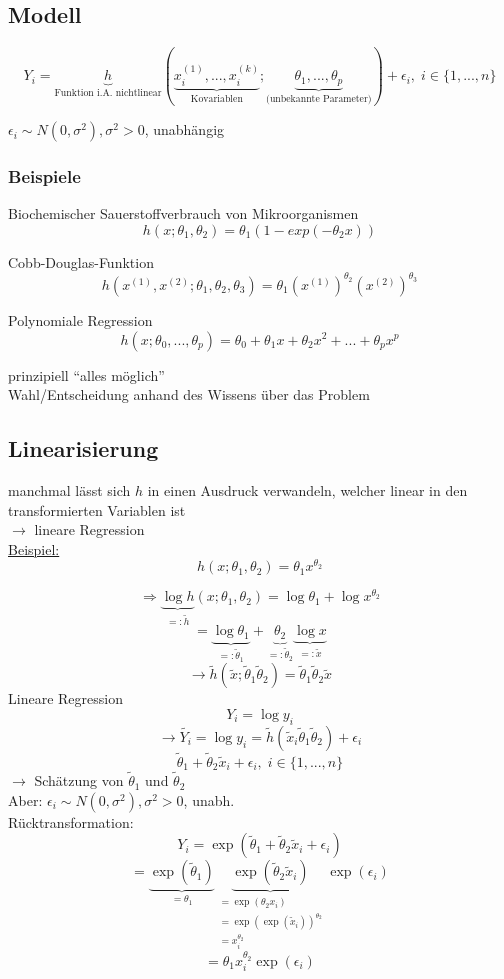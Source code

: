 \documentclass[10pt]{report}
\theoremstyle{definition}
\begin{document}
\subsection{Modell}
\[Y_i = \underbrace{h}_{\text{Funktion i.A. nichtlinear}} \left(\underbrace{x_i^{(1)},...,x_i^{(k)}}_{\text{Kovariablen}};
\underbrace{\theta_1,...,\theta_p}_{\text{(unbekannte Parameter)}} \right) + \epsilon_i, \; i \in \{1,...,n\} \]

$\epsilon_i \sim N(0,\sigma^2) , \sigma^2 >0$, unabhängig

\subsubsection{Beispiele}
Biochemischer Sauerstoffverbrauch von Mikroorganismen
\[h(x;\theta_1,\theta_2) = \theta_1(1-exp(-\theta_2 x)) \]

Cobb-Douglas-Funktion
\[h(x^{(1)},x^{(2)}; \theta_1, \theta_2, \theta_3)= \theta_1(x^{(1)})^{\theta_2} (x^{(2)})^{\theta_3} \]

Polynomiale Regression
\[h(x; \theta_0,..., \theta_p)= \theta_0 + \theta_1 x  + \theta_2 x^2 + ... + \theta_p x^p \]

prinzipiell ``alles möglich'' \\

Wahl/Entscheidung anhand des Wissens über das Problem

\subsection{Linearisierung}
manchmal lässt sich $h$ in einen Ausdruck verwandeln, welcher linear in den transformierten Variablen ist \\
$\rightarrow$ lineare Regression \\
\underline{Beispiel:}
\[ h(x; \theta_1, \theta_2) = \theta_1 x^{\theta_2} \]

\[ \Rightarrow \underbrace{\log h}_{=:  \tilde{h}}(x; \theta_1, \theta_2) = \log \theta_1 + \log x^{\theta_2} \]
\[= \underbrace{\log \theta_1}_{=: \tilde{\theta}_1} + \underbrace{\theta_2}_{=: \tilde{\theta}_2} \underbrace{ \log x }_{=: \tilde{x}} \]
\[ \rightarrow \tilde{h}(\tilde{x};\tilde{\theta}_1 \tilde{\theta}_2 ) = \tilde{\theta}_1 \tilde{\theta}_2 \tilde{x} \]
Lineare Regression
\[ Y_i=\log y_i \]
\[ \rightarrow \tilde{Y_i} = \log y_i = \tilde{h}(\tilde{x}_i \tilde{\theta}_1 \tilde{\theta}_2) + \epsilon_i \]
\[ \tilde{\theta}_1 + \tilde{\theta}_2 \tilde{x}_i + \epsilon_i, \; i \in \{1,...,n\} \]
$\rightarrow$ Schätzung von $\tilde{\theta}_1$ und $\tilde{\theta}_2$ \\
Aber: $\epsilon_i \sim N(0,\sigma^2), \sigma^2 > 0$, unabh.\\
Rücktransformation:
\[ Y_i = \exp(\tilde{\theta}_1 + \tilde{\theta}_2 \tilde{x}_i + \epsilon_i ) \]
\[ = \underbrace{\exp(\tilde{\theta}_1)}_{=\theta_1} \underbrace{\exp(\tilde{\theta}_2\tilde{x}_i)}_{
	\substack{= \exp(\theta_2 x_i) \\ = \exp ( \exp ( \tilde{x}_i ))^{\theta_2} \\ = x_i^{\theta_2} }}
\exp(\epsilon_i) \]
\[= \theta_1 x_i^{\theta_2} \exp (\epsilon_i) \]
\end{document}
